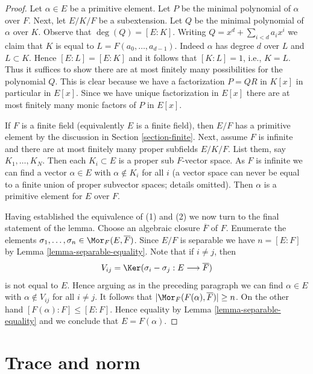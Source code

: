 \begin{proof}
Let $\alpha \in E$ be a primitive element. Let $P$ be the minimal
polynomial of $\alpha$ over $F$. Next, let $E/K/F$ be a subextension.
Let $Q$ be the minimal polynomial of $\alpha$ over $K$. Observe that
$\deg(Q) = [E : K]$. Writing $Q = x^d + \sum_{i < d} a_i x^i$ we claim that
$K$ is equal to $L = F(a_0, \ldots, a_{d - 1})$. Indeed $\alpha$ has degree
$d$ over $L$ and $L \subset K$. Hence $[E : L] = [E : K]$ and it follows
that $[K : L] = 1$, i.e., $K = L$.
Thus it suffices to show there are at most finitely many possibilities
for the polynomial $Q$. This is clear because we have a factorization
$P = QR$  in $K[x]$ in particular in $E[x]$. Since we have unique
factorization in $E[x]$ there are at most finitely many monic
factors of $P$ in $E[x]$.

\medskip\noindent
If $F$ is a finite field (equivalently $E$ is a finite field), then
$E/F$ has a primitive element by the discussion in
Section \ref{section-finite}.
Next, assume $F$ is infinite and there are at most finitely many proper
subfields $E/K/F$. List them, say $K_1, \ldots, K_N$. Then
each $K_i \subset E$ is a proper sub $F$-vector space. As $F$ is infinite
we can find a vector $\alpha \in E$ with $\alpha \not \in K_i$ for all $i$
(a vector space can never be equal to a finite union of proper subvector spaces;
details omitted). Then $\alpha$ is a primitive element for $E$ over $F$.

\medskip\noindent
Having established the equivalence of (1) and (2) we now turn to
the final statement of the lemma. Choose an algebraic closure
$\overline{F}$ of $F$. Enumerate the elements
$\sigma_1, \ldots, \sigma_n \in \Mor_F(E, \overline{F})$.
Since $E/F$ is separable we have $n = [E : F]$ by
Lemma \ref{lemma-separable-equality}.
Note that if $i \not = j$, then
$$
V_{ij} = \Ker(\sigma_i - \sigma_j : E \longrightarrow \overline{F})
$$
is not equal to $E$. Hence arguing as in the preceding paragraph
we can find $\alpha \in E$ with $\alpha \not \in V_{ij}$ for all
$i \not = j$. It follows that $|\Mor_F(F(\alpha), \overline{F})| \geq n$.
On the other hand $[F(\alpha) : F] \leq [E : F]$. Hence equality
by Lemma \ref{lemma-separable-equality}
and we conclude that $E = F(\alpha)$.
\end{proof}






\section{Trace and norm}
\label{section-trace-pairing}

